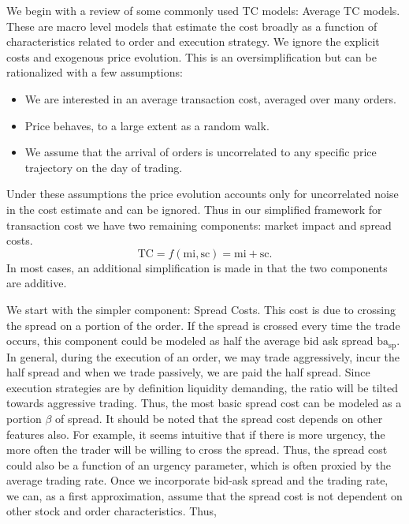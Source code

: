 We begin with a review of some commonly used TC models: Average TC models. These are macro level models that estimate the cost broadly as a function of characteristics related to order and execution strategy. We ignore the explicit costs and exogenous price evolution. This is an oversimplification but can be rationalized with a few assumptions:
        \begin{itemize}
         \item We are interested in an average transaction cost, averaged over many orders.
         \item Price behaves, to a large extent as a random walk.
         \item We assume that the arrival of orders is uncorrelated to any specific price trajectory on the day of trading. 
         \end{itemize} 


Under these assumptions the price evolution accounts only for uncorrelated noise in the cost estimate and can be ignored. Thus in our simplified framework for transaction cost we have two remaining components: market impact and spread costs. 
        \begin{equation} \label{eq:tc_1}
        \text{TC}= f(\text{mi},\text{sc})= \text{mi} + \text{sc}.
        \end{equation}
In most cases, an additional simplification is made in that the two components are additive. 


We start with the simpler component: Spread Costs. This cost is due to crossing the spread on a portion of the order. If the spread is crossed every time the trade occurs, this component could be modeled as half the average bid ask spread $\text{ba}_\text{sp}$. In general, during the execution of an order, we may trade aggressively, incur the half spread and when we trade passively, we are paid the half spread. Since execution strategies are by definition liquidity demanding, the ratio will be tilted towards aggressive trading. Thus, the most basic spread cost can be modeled as a portion $\beta$ of spread. It should be noted that the spread cost depends on other features also. For example, it seems intuitive that if there is more urgency, the more often the trader will be willing to cross the spread. Thus, the spread cost could also be a function of an urgency parameter, which is often proxied by the average trading rate. Once we incorporate bid-ask spread and the trading rate, we can, as a first approximation, assume that the spread cost is not dependent on other stock and order characteristics. Thus,

